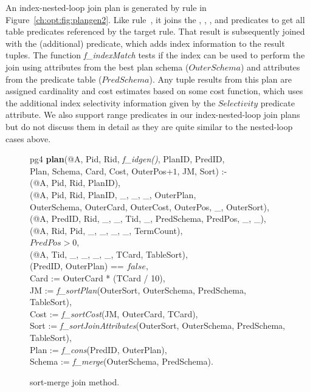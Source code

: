 An index-nested-loop join plan is generated by rule  in
Figure~\ref{ch:opt:fig:plangen2}.  Like rule~, it joins the
, , , and  predicates
to get all table predicates referenced by the target rule.  That result is
subsequently joined with the (additional)  predicate, which adds
index information to the result tuples.  The function {\em f\_indexMatch} tests
if the index can be used to perform the join using attributes from the best
plan schema ($OuterSchema$) and attributes from the predicate table
($PredSchema$).  Any tuple results from this plan are assigned cardinality and
cost estimates based on some cost function, which uses the additional index
selectivity information given by the $Selectivity$  predicate
attribute.  We also support range predicates in our index-nested-loop join
plans but do not discuss them in detail as they are quite similar to the
nested-loop cases above.

\begin{figure*}
\ssp
\centering
\begin{boxedminipage}{\linewidth}
pg4 {\bf plan}(@A, Pid, Rid, {\em f\_idgen()}, PlanID, PredID, \\
\datalogspace \xspace Plan, Schema, Card, Cost, OuterPos+$1$, JM, Sort) :-\\
(@A, Pid, Rid, PlanID),\\
(@A, Pid, Rid, PlanID, \_, \_, \_, OuterPlan, \\
\datalogspace \datalogspace OuterSchema, OuterCard, OuterCost, OuterPos, \_, OuterSort),  \\   
(@A, PredID, Rid, \_, \_, Tid, \_, PredSchema, PredPos, \_, \_),\\
(@A, Rid, Pid, \_, \_, \_, \_, TermCount), \\
\datalogspace $PredPos > 0$,\\
(@A, Tid, \_, \_, \_, \_, TCard, TableSort),\\
(PredID, OuterPlan) == $false$,\\
\datalogspace Card   := OuterCard * (TCard / 10),\\
\datalogspace JM     := {\em f\_sortPlan}(OuterSort, OuterSchema, PredSchema, TableSort), \\
\datalogspace Cost   := {\em f\_sortCost}(JM, OuterCard, TCard), \\
\datalogspace Sort   := {\em f\_sortJoinAttributes}(OuterSort, OuterSchema, PredSchema, TableSort), \\  
\datalogspace Plan   := {\em f\_cons}(PredID, OuterPlan), \\
\datalogspace Schema := {\em f\_merge}(OuterSchema, PredSchema).\\
\end{boxedminipage}
\caption{\label{ch:opt:fig:plangen3}sort-merge join method.}
\end{figure*}

